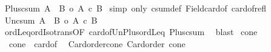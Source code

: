 \begin{isabellebody}
%
\endisatagproof
{\isafoldproof}%
%
\isadelimproof
\isanewline
%
\endisadelimproof
\isanewline
{}\isamarkupfalse%
\ Plus{\isacharunderscore}{\kern0pt}csum{\isacharcolon}{\kern0pt}\ {\isachardoublequoteopen}{\isacharbar}{\kern0pt}A\ {\isacharless}{\kern0pt}{\isacharplus}{\kern0pt}{\isachargreater}{\kern0pt}\ B{\isacharbar}{\kern0pt}\ {\isacharequal}{\kern0pt}o\ {\isacharbar}{\kern0pt}A{\isacharbar}{\kern0pt}\ {\isacharplus}{\kern0pt}c\ {\isacharbar}{\kern0pt}B{\isacharbar}{\kern0pt}{\isachardoublequoteclose}\isanewline
%
\isadelimproof
%
\endisadelimproof
%
\isatagproof
{}\isamarkupfalse%
\ {\isacharparenleft}{\kern0pt}simp\ only{\isacharcolon}{\kern0pt}\ csum{\isacharunderscore}{\kern0pt}def\ Field{\isacharunderscore}{\kern0pt}card{\isacharunderscore}{\kern0pt}of\ card{\isacharunderscore}{\kern0pt}of{\isacharunderscore}{\kern0pt}refl{\isacharparenright}{\kern0pt}%
\endisatagproof
{\isafoldproof}%
%
\isadelimproof
\isanewline
%
\endisadelimproof
\isanewline
{}\isamarkupfalse%
\ Un{\isacharunderscore}{\kern0pt}csum{\isacharcolon}{\kern0pt}\ {\isachardoublequoteopen}{\isacharbar}{\kern0pt}A\ {\isasymunion}\ B{\isacharbar}{\kern0pt}\ {\isasymle}o\ {\isacharbar}{\kern0pt}A{\isacharbar}{\kern0pt}\ {\isacharplus}{\kern0pt}c\ {\isacharbar}{\kern0pt}B{\isacharbar}{\kern0pt}{\isachardoublequoteclose}\isanewline
%
\isadelimproof
%
\endisadelimproof
%
\isatagproof
{}\isamarkupfalse%
\ ordLeq{\isacharunderscore}{\kern0pt}ordIso{\isacharunderscore}{\kern0pt}trans{\isacharbrackleft}{\kern0pt}OF\ card{\isacharunderscore}{\kern0pt}of{\isacharunderscore}{\kern0pt}Un{\isacharunderscore}{\kern0pt}Plus{\isacharunderscore}{\kern0pt}ordLeq\ Plus{\isacharunderscore}{\kern0pt}csum{\isacharbrackright}{\kern0pt}\ \isamarkupfalse%
\ blast%
\endisatagproof
{\isafoldproof}%
%
\isadelimproof
%
\endisadelimproof
%
\isadelimdocument
%
\endisadelimdocument
%
\isatagdocument
%
\isamarkuptrue%
%
\endisatagdocument
{\isafolddocument}%
%
\isadelimdocument
%
\endisadelimdocument
{}\isamarkupfalse%
\ cone\ \isanewline
\ \ {\isachardoublequoteopen}cone\ {\isacharequal}{\kern0pt}\ card{\isacharunderscore}{\kern0pt}of\ {\isacharbraceleft}{\kern0pt}{\isacharparenleft}{\kern0pt}{\isacharparenright}{\kern0pt}{\isacharbraceright}{\kern0pt}{\isachardoublequoteclose}\isanewline
\isanewline
{}\isamarkupfalse%
\ Card{\isacharunderscore}{\kern0pt}order{\isacharunderscore}{\kern0pt}cone{\isacharcolon}{\kern0pt}\ {\isachardoublequoteopen}Card{\isacharunderscore}{\kern0pt}order\ cone{\isachardoublequoteclose}\isanewline

\end{isabellebody}
